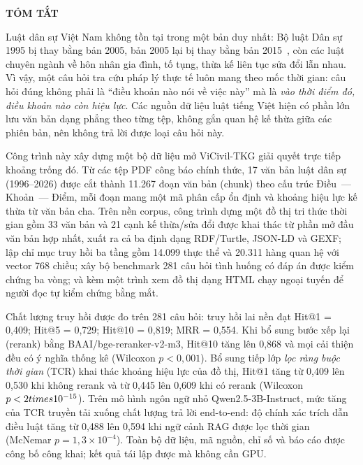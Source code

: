 \documentclass[12pt,a4paper]{report}
\renewcommand{\_}{\textunderscore\allowbreak}
\begin{document}
\begin{center}
{\large\bfseries\color{ink} TÓM TẮT\par}
\end{center}
\vspace{0.2cm}

Luật dân sự Việt Nam không tồn tại trong một bản duy nhất: Bộ luật Dân sự 1995 bị thay bằng bản 2005, bản 2005 lại bị thay bằng bản 2015~\cite{blds2015}, còn các luật chuyên ngành về hôn nhân gia đình, tố tụng, thừa kế liên tục sửa đổi lẫn nhau. Vì vậy, một câu hỏi tra cứu pháp lý thực tế luôn mang theo mốc thời gian: câu hỏi đúng không phải là ``điều khoản nào nói về việc này'' mà là \emph{vào thời điểm đó, điều khoản nào còn hiệu lực}. Các nguồn dữ liệu luật tiếng Việt hiện có phần lớn lưu văn bản dạng phẳng theo từng tệp, không gắn quan hệ kế thừa giữa các phiên bản, nên không trả lời được loại câu hỏi này.

Công trình này xây dựng một bộ dữ liệu mở ViCivil-TKG giải quyết trực tiếp khoảng trống đó. Từ các tệp PDF công báo chính thức, 17 văn bản luật dân sự (1996--2026) được cắt thành 11.267 đoạn văn bản (chunk) theo cấu trúc Điều~--- Khoản~--- Điểm, mỗi đoạn mang một mã phân cấp ổn định và khoảng hiệu lực kế thừa từ văn bản cha. Trên nền corpus, công trình dựng một đồ thị tri thức thời gian gồm 33 văn bản và 21 cạnh kế thừa/sửa đổi được khai thác từ phần mở đầu văn bản hợp nhất, xuất ra cả ba định dạng RDF/Turtle, JSON-LD và GEXF; lập chỉ mục truy hồi ba tầng gồm 14.099 thực thể và 20.311 hàng quan hệ với vector 768 chiều; xây bộ benchmark 281 câu hỏi tình huống có đáp án được kiểm chứng ba vòng; và kèm một trình xem đồ thị dạng HTML chạy ngoại tuyến để người đọc tự kiểm chứng bằng mắt.

Chất lượng truy hồi được đo trên 281 câu hỏi: truy hồi lai nền đạt Hit@1 = 0,409; Hit@5 = 0,729; Hit@10 = 0,819; MRR = 0,554. Khi bổ sung bước xếp lại (rerank) bằng BAAI/bge-reranker-v2-m3, Hit@10 tăng lên 0,868 và mọi cải thiện đều có ý nghĩa thống kê (Wilcoxon $p<0{,}001$). Bổ sung tiếp lớp \emph{lọc ràng buộc thời gian} (TCR) khai thác khoảng hiệu lực của đồ thị, Hit@1 tăng từ 0,409 lên 0,530 khi không rerank và từ 0,445 lên 0,609 khi có rerank (Wilcoxon $p<2\\times10^{-15}$). Trên mô hình ngôn ngữ nhỏ Qwen2.5-3B-Instruct, mức tăng của TCR truyền tải xuống chất lượng trả lời end-to-end: độ chính xác trích dẫn điều luật tăng từ 0,488 lên 0,594 khi ngữ cảnh RAG được lọc thời gian (McNemar $p = 1{,}3\times10^{-4}$). Toàn bộ dữ liệu, mã nguồn, chỉ số và báo cáo được công bố công khai; kết quả tái lập được mà không cần GPU.
\end{document}
